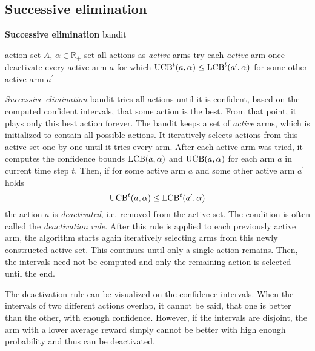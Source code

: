 \documentclass[../main.tex]{subfiles}
\begin{document}
\subsection{Successive elimination}\label{bandit:stochastic:succelim}
\begin{algorithm}
    \caption{\textbf{Successive elimination} bandit}
    \label{bandit:stochastic:succelim:alg}
    \begin{algorithmic}[1]
        \Require action set $A$, $\alpha \in \mathbb{R}_{+}$
        \State set all actions as \textit{active} arms
        \Statex
        \State try each \textit{active} arm once
        \State deactivate every active arm $a$ for which $\text{UCB}^t(a, \alpha) \leq \text{LCB}^t(a^{\prime}, \alpha)$ for some other active arm $a^{\prime}$
    \end{algorithmic}
\end{algorithm}
\textit{Successive elimination} bandit  tries all actions until it is confident, based on the computed confident intervals, that some action is the best.
From that point, it plays only this best action forever.
The bandit keeps a set of \textit{active} arms, which is initialized to contain all possible actions.
It iteratively selects actions from this active set one by one until it tries every arm.
After each active arm was tried, it computes the confidence bounds $\text{LCB}(a, \alpha)$ and $\text{UCB}(a, \alpha)$ for each arm $a$ in current time step $t$.
Then, if for some active arm $a$ and some other active arm $a^{\prime}$ holds
\begin{equation}\label{bandit:stochastic:succelim:deactivation}
    \text{UCB}^t(a, \alpha) \leq \text{LCB}^t(a^{\prime}, \alpha)
\end{equation}
the action $a$ is \textit{deactivated}, i.e. removed from the active set.
The condition  is often called the \textit{deactivation rule}.
After this rule is applied to each previously active arm, the algorithm starts again iteratively selecting arms from this newly constructed active set.
This continues until only a single action remains.
Then, the intervals need not be computed and only the remaining action is selected until the end.

The deactivation rule can be visualized on the confidence intervals.
When the intervals of two different actions overlap, it cannot be said, that one is better than the other, with enough confidence.
However, if the intervals are disjoint, the arm with a lower average reward simply cannot be better with high enough probability and thus can be deactivated.
\end{document}
